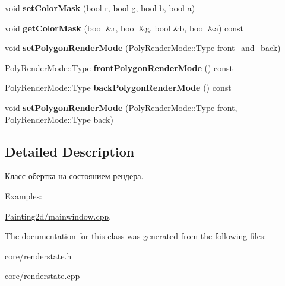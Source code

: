 \begin{DoxyCompactItemize}
\item 
\hypertarget{class_tempest_1_1_render_state_accd501fa7122d1022e5eb99734e7741a}{void {\bfseries set\+Color\+Mask} (bool r, bool g, bool b, bool a)}\label{class_tempest_1_1_render_state_accd501fa7122d1022e5eb99734e7741a}

\item 
\hypertarget{class_tempest_1_1_render_state_adc9c754f3ef306bf154aa5677099a0da}{void {\bfseries get\+Color\+Mask} (bool \&r, bool \&g, bool \&b, bool \&a) const }\label{class_tempest_1_1_render_state_adc9c754f3ef306bf154aa5677099a0da}

\item 
\hypertarget{class_tempest_1_1_render_state_ab481f272227df44118bf3264cfab9c0b}{void {\bfseries set\+Polygon\+Render\+Mode} (Poly\+Render\+Mode\+::\+Type front\+\_\+and\+\_\+back)}\label{class_tempest_1_1_render_state_ab481f272227df44118bf3264cfab9c0b}

\item 
\hypertarget{class_tempest_1_1_render_state_a56967316e62592aba075b07e68d395bc}{Poly\+Render\+Mode\+::\+Type {\bfseries front\+Polygon\+Render\+Mode} () const }\label{class_tempest_1_1_render_state_a56967316e62592aba075b07e68d395bc}

\item 
\hypertarget{class_tempest_1_1_render_state_a43331ae75a1a8a984a9fbb6592366da7}{Poly\+Render\+Mode\+::\+Type {\bfseries back\+Polygon\+Render\+Mode} () const }\label{class_tempest_1_1_render_state_a43331ae75a1a8a984a9fbb6592366da7}

\item 
\hypertarget{class_tempest_1_1_render_state_a5c902e1d87e1d9bc5a10403d65536a57}{void {\bfseries set\+Polygon\+Render\+Mode} (Poly\+Render\+Mode\+::\+Type front, Poly\+Render\+Mode\+::\+Type back)}\label{class_tempest_1_1_render_state_a5c902e1d87e1d9bc5a10403d65536a57}

\end{DoxyCompactItemize}


\subsection{Detailed Description}
Класс обертка на состоянием рендера. \begin{Desc}
\item[Examples\+: ]\par
\hyperlink{_painting2d_2mainwindow_8cpp-example}{Painting2d/mainwindow.\+cpp}.\end{Desc}


The documentation for this class was generated from the following files\+:\begin{DoxyCompactItemize}
\item 
core/renderstate.\+h\item 
core/renderstate.\+cpp\end{DoxyCompactItemize}
